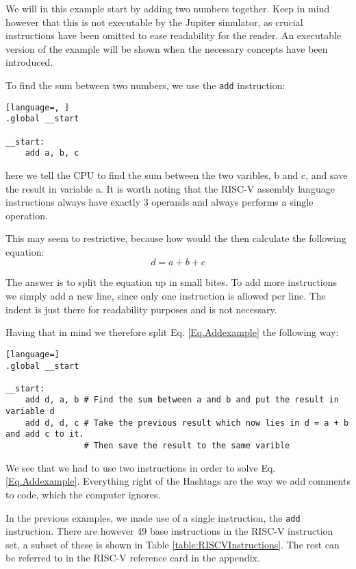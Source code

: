     We will in this example start by adding two numbers together. Keep in mind however that this is not executable by the Jupiter simulator, as crucial instructions have been omitted to ease readability for the reader. An executable version of the example will be shown when the necessary concepts have been introduced.
    
    To find the sum between two numbers, we use the \texttt{add} instruction:
    \begin{lstlisting}[language=, ]
.global __start

__start:
    add a, b, c
    \end{lstlisting}
    here we tell the CPU to find the sum between the two varibles, b and c, and save the result in variable a. It is worth noting that the RISC-V assembly language instructions always have exactly 3 operands and always performs a single operation.
    
    This may seem to restrictive, because how would the then calculate the following equation:
    \begin{equation}\label{Eq.Addexample}
        d = a + b + c
    \end{equation}
    
    The answer is to split the equation up in small bites. To add more instructions we simply add a new line, since only one instruction is allowed per line. The indent is just there for readability purposes and is not necessary. 
    
    Having that in mind we therefore split Eq. \ref{Eq.Addexample} the following way:
    \begin{lstlisting}[language=]
.global __start

__start:
    add d, a, b # Find the sum between a and b and put the result in variable d
    add d, d, c # Take the previous result which now lies in d = a + b and add c to it. 
                # Then save the result to the same varible 
    \end{lstlisting}
    We see that we had to use two instructions in order to solve Eq. \ref{Eq.Addexample}. Everything right of the Hashtags are the way we add comments to code, which the computer ignores.
    
    In the previous examples, we made use of a single instruction, the \texttt{add} instruction. There are however 49 base instructions in the RISC-V instruction set, a subset of these is shown in Table \ref{table:RISCVInstructions}. The rest can be referred to in the RISC-V reference card in the appendix.   

